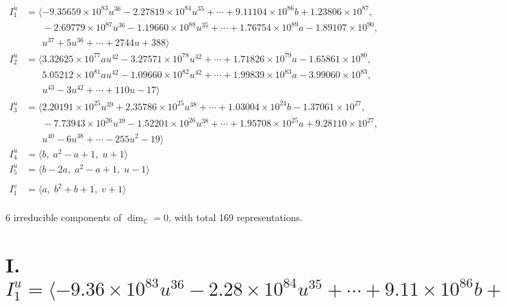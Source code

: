 \documentclass[1p]{elsarticle_modified}
\theoremstyle{definition}
\begin{document}
\begin{align*}
I^u_{1}&=\langle 
-9.35659\times10^{83} u^{36}-2.27819\times10^{84} u^{35}+\cdots+9.11104\times10^{86} b+1.23806\times10^{87},\\
\phantom{I^u_{1}}&\phantom{= \langle  }-2.69779\times10^{87} u^{36}-1.19660\times10^{88} u^{35}+\cdots+1.76754\times10^{89} a-1.89107\times10^{90},\\
\phantom{I^u_{1}}&\phantom{= \langle  }u^{37}+5 u^{36}+\cdots+2744 u+388\rangle \\
I^u_{2}&=\langle 
3.32625\times10^{77} a u^{42}-3.27571\times10^{78} u^{42}+\cdots+1.71826\times10^{79} a-1.65861\times10^{80},\\
\phantom{I^u_{2}}&\phantom{= \langle  }5.05212\times10^{81} a u^{42}-1.09660\times10^{82} u^{42}+\cdots+1.99839\times10^{83} a-3.99060\times10^{83},\\
\phantom{I^u_{2}}&\phantom{= \langle  }u^{43}-3 u^{42}+\cdots+110 u-17\rangle \\
I^u_{3}&=\langle 
2.20191\times10^{25} u^{39}+2.35786\times10^{25} u^{38}+\cdots+1.03004\times10^{24} b-1.37061\times10^{27},\\
\phantom{I^u_{3}}&\phantom{= \langle  }-7.73943\times10^{26} u^{39}-1.52201\times10^{26} u^{38}+\cdots+1.95708\times10^{25} a+9.28110\times10^{27},\\
\phantom{I^u_{3}}&\phantom{= \langle  }u^{40}-6 u^{38}+\cdots-255 u^2-19\rangle \\
I^u_{4}&=\langle 
b,\;a^2- a+1,\;u+1\rangle \\
I^u_{5}&=\langle 
b-2 a,\;a^2- a+1,\;u-1\rangle \\
\\
I^v_{1}&=\langle 
a,\;b^2+b+1,\;v+1\rangle \\
\end{align*}
\raggedright * 6 irreducible components of $\dim_{\mathbb{C}}=0$, with total 169 representations.\\
\newpage
\renewcommand{\arraystretch}{1}
\centering \section*{I. $I^u_{1}= \langle -9.36\times10^{83} u^{36}-2.28\times10^{84} u^{35}+\cdots+9.11\times10^{86} b+1.24\times10^{87},\;-2.70\times10^{87} u^{36}-1.20\times10^{88} u^{35}+\cdots+1.77\times10^{89} a-1.89\times10^{90},\;u^{37}+5 u^{36}+\cdots+2744 u+388 \rangle$}
\end{document}
